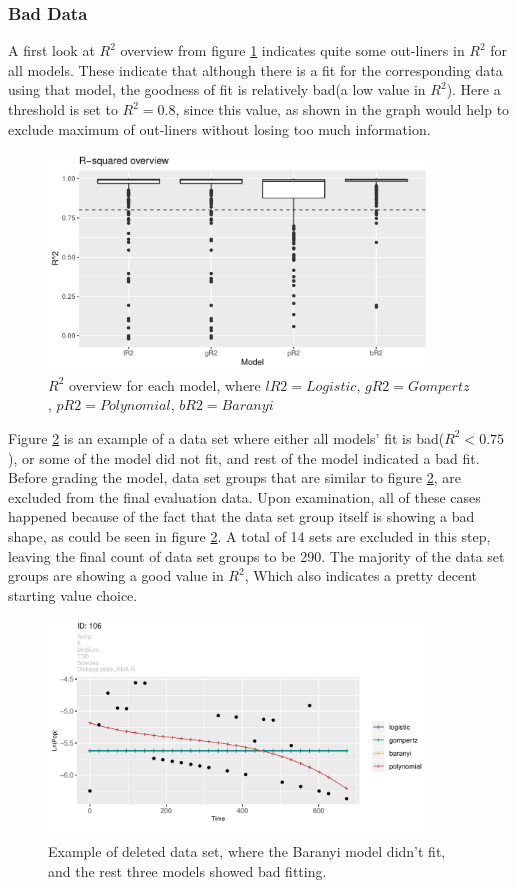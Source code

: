 \documentclass[11pt]{article}
\begin{document}
\subsubsection{Bad Data}
A first look at $R^2$ overview from figure \ref{fig:r2} indicates quite some out-liners in $R^2$ for all models. These indicate that although there is a fit for the corresponding data using that model, the goodness of fit is relatively bad(a low value in $R^2$).
Here a threshold is set to $R^2 = 0.8$, since this value, as shown in the graph would help to exclude maximum of out-liners without losing too much information.
\FloatBarrier
\begin{figure}[!htbp]
    \centering
    \includegraphics[width=0.9\textwidth]{../Results/anaPlots/r2snap.pdf}
    \caption{$R^2$ overview for each model, where $lR2=Logistic$, $gR2=Gompertz$, $pR2=Polynomial$, $bR2=Baranyi$}
    \label{fig:r2}
\end{figure}
\FloatBarrier
Figure \ref{fig:baddata} is an example of a data set where either all models' fit is bad($R^2 < 0.75$), or some of the model did not fit, and rest of the model indicated a bad fit. Before grading the model, data set groups that are similar to figure \ref{fig:baddata}, are excluded from the final evaluation data. Upon examination, all of these cases happened because of the fact that the data set group itself is showing a bad shape, as could be seen in figure \ref{fig:baddata}. A total of 14 sets are excluded in this step, leaving the final count of data set groups to be 290. The majority of the data set groups are showing a good value in $R^2$, Which also indicates a pretty decent starting value choice.
\FloatBarrier
\begin{figure}[!htbp]
    \centering
    \includegraphics[width=0.9\textwidth]{../Results/allPlots/ 106 .pdf}
    \caption{Example of deleted data set, where the Baranyi model didn't fit, and the rest three models showed bad fitting.}
    \label{fig:baddata}
\end{figure}
\end{document}
